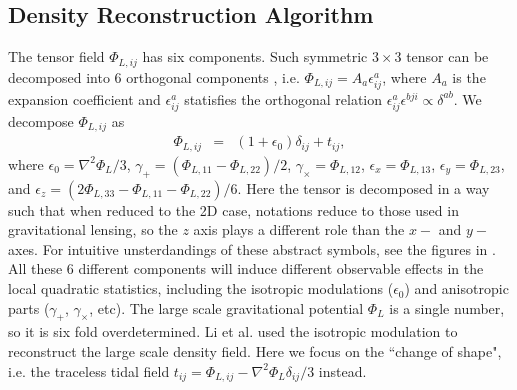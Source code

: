 \documentclass[aps,prd,twocolumn,showpacs,superscriptaddress,groupedaddress,nofootinbib]{revtex4}  %
\begin{document}
\subsection{Density Reconstruction Algorithm}
The tensor field $\Phi_{L,ij}$ has six components. Such symmetric
$3\times3$ tensor can be decomposed into 6 orthogonal components 
\cite{1973gw,2012:jeong}, 
i.e. $\Phi_{L,ij}=A_a\epsilon^a_{ij}$, where $A_a$ is
the expansion coefficient and $\epsilon^a_{ij}$ statisfies the orthogonal
relation $\epsilon^a_{ij}\epsilon^{bji}\propto\delta^{ab}$. We decompose
$\Phi_{L,ij}$ as
\begin{eqnarray}
\Phi_{L,ij}
&=&(1+\epsilon_0)\delta_{ij}+t_{ij},
\end{eqnarray}
where $\epsilon_0=\nabla^2\Phi_L/3$, $\gamma_{+}=(\Phi_{L,11}-\Phi_{L,22})/2$,
$\gamma_{\times}=\Phi_{L,12}$, $\epsilon_{x}=\Phi_{L,13}$, 
$\epsilon_{y}=\Phi_{L,23}$, and 
$\epsilon_{z}=(2\Phi_{L,33}-\Phi_{L,11}-\Phi_{L,22})/6$. 
Here the tensor is decomposed in a way such that when reduced 
to the 2D case, notations reduce to those used in gravitational lensing, 
so the $z$ axis plays a different role than the $x-$ and $y-$axes.
For intuitive unsterdandings of these abstract symbols, 
see the figures in \cite{2012:jeong}. All these 6 different components will induce
different observable effects in the local quadratic statistics, including the
isotropic modulations ($\epsilon_0$) and anisotropic parts ($\gamma_+$, 
$\gamma_\times$, etc). The large scale gravitational potential $\Phi_L$ 
 is a single number, so it is six fold overdetermined. 
Li et al.\cite{2014li} used the isotropic modulation to reconstruct the large
scale density field. Here we focus on the ``change of shape", i.e. the traceless tidal field 
$t_{ij}=\Phi_{L,ij}-\nabla^2\Phi_{L}\delta_{ij}/3$ instead.
\end{document}
